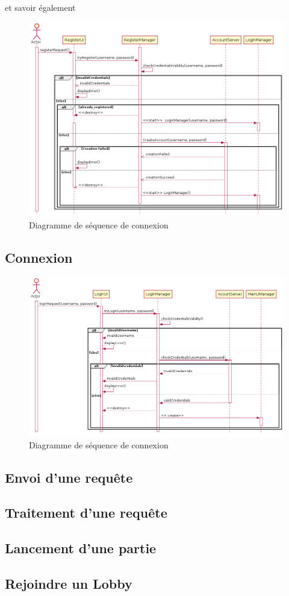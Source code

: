 \documentclass{article}
\begin{document}
et savoir également 
\begin{figure}[!h]
    \centering
    \includegraphics[width=1\textwidth]{../res/uml/sequence/InscriptionSequence.png}
    \caption{Diagramme de séquence de connexion}
    \label{fig:Royal-Competition}
\end{figure}

\subsection{Connexion}

\begin{figure}[!h]
    \centering
    \includegraphics[width=1\textwidth]{../res/uml/sequence/ConnexionSequence.png}
    \caption{Diagramme de séquence de connexion}
    \label{fig:Royal-Competition}
\end{figure}

\subsection{Envoi d'une requête}

\subsection{Traitement d'une requête}

\subsection{Lancement d'une partie}

\subsection{Rejoindre un Lobby}
\end{document}
